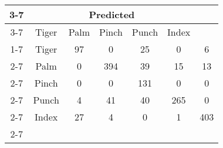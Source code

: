 \documentclass{standalone}
\begin{document}
 
 \begin{tabular}{|c |c |c |c |c |c |c |}
\cline{3-7}\multicolumn{2}{c|}{} & \multicolumn{5}{c|}{Predicted} \\ 
\cline{3-7} \multicolumn{2}{c |}{ } & Tiger & Palm & Pinch & Punch & Index\\ 
\cline{1-7}\multirow{5}{*}{\rotatebox[origin=c]{90}{Actual}} & Tiger & 97 & 0 & 25 & 0 & 6\\ 
 \cline{2-7} & Palm & 0 & 394 & 39 & 15 & 13\\ 
 \cline{2-7} & Pinch & 0 & 0 & 131 & 0 & 0\\ 
 \cline{2-7} & Punch & 4 & 41 & 40 & 265 & 0\\ 
 \cline{2-7} & Index & 27 & 4 & 0 & 1 & 403\\ 
 \cline{2-7}\hline \end{tabular}
 
\end{document}
